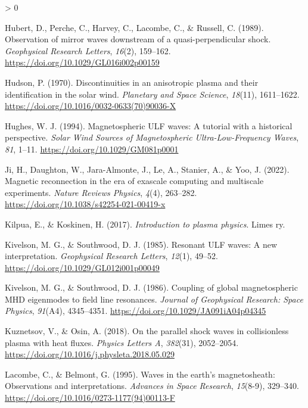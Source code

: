 \documentclass[
  notoc %
]{tufte-book}
\newlength{\cslhangindent}
\newenvironment{CSLReferences}[2] %
 {%
  \setlength{\parindent}{0pt}
  \ifodd #1 \everypar{\setlength{\hangindent}{\cslhangindent}}\ignorespaces\fi
  \ifnum #2 > 0
  \setlength{\parskip}{#2\baselineskip}
  \fi
 }%
 {}
\begin{document}
\begin{CSLReferences}{1}{0}
\leavevmode\hypertarget{ref-hubert1989observation}{}%
Hubert, D., Perche, C., Harvey, C., Lacombe, C., \& Russell, C. (1989).
Observation of mirror waves downstream of a quasi-perpendicular shock.
\emph{Geophysical Research Letters}, \emph{16}(2), 159--162.
\url{https://doi.org/10.1029/GL016i002p00159}

\leavevmode\hypertarget{ref-hudson1970discontinuities}{}%
Hudson, P. (1970). Discontinuities in an anisotropic plasma and their
identification in the solar wind. \emph{Planetary and Space Science},
\emph{18}(11), 1611--1622.
\url{https://doi.org/10.1016/0032-0633(70)90036-X}

\leavevmode\hypertarget{ref-hughes1994}{}%
Hughes, W. J. (1994). Magnetospheric ULF waves: A tutorial with a
historical perspective. \emph{Solar Wind Sources of Magnetospheric
Ultra-Low-Frequency Waves}, \emph{81}, 1--11.
\url{https://doi.org/10.1029/GM081p0001}

\leavevmode\hypertarget{ref-ji2022magnetic}{}%
Ji, H., Daughton, W., Jara-Almonte, J., Le, A., Stanier, A., \& Yoo, J.
(2022). Magnetic reconnection in the era of exascale computing and
multiscale experiments. \emph{Nature Reviews Physics}, \emph{4}(4),
263--282. \url{https://doi.org/10.1038/s42254-021-00419-x}

\leavevmode\hypertarget{ref-kilpua2017intro}{}%
Kilpua, E., \& Koskinen, H. (2017). \emph{Introduction to plasma
physics}. Limes ry.

\leavevmode\hypertarget{ref-kivelson1985resonant}{}%
Kivelson, M. G., \& Southwood, D. J. (1985). Resonant ULF waves: A new
interpretation. \emph{Geophysical Research Letters}, \emph{12}(1),
49--52. \url{https://doi.org/10.1029/GL012i001p00049}

\leavevmode\hypertarget{ref-kivelson1986coupling}{}%
Kivelson, M. G., \& Southwood, D. J. (1986). Coupling of global
magnetospheric MHD eigenmodes to field line resonances. \emph{Journal of
Geophysical Research: Space Physics}, \emph{91}(A4), 4345--4351.
\url{https://doi.org/10.1029/JA091iA04p04345}

\leavevmode\hypertarget{ref-kuznetsov2018parallel}{}%
Kuznetsov, V., \& Osin, A. (2018). On the parallel shock waves in
collisionless plasma with heat fluxes. \emph{Physics Letters A},
\emph{382}(31), 2052--2054.
\url{https://doi.org/10.1016/j.physleta.2018.05.029}

\leavevmode\hypertarget{ref-lacombe1995waves}{}%
Lacombe, C., \& Belmont, G. (1995). Waves in the earth's magnetosheath:
Observations and interpretations. \emph{Advances in Space Research},
\emph{15}(8-9), 329--340.
\url{https://doi.org/10.1016/0273-1177(94)00113-F}


\end{CSLReferences}
\end{document}

